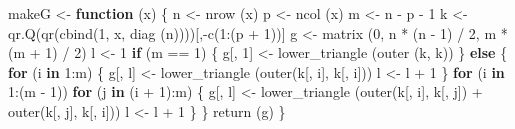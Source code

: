 \documentclass[
  12pt,
]{book}
\newenvironment{Shaded}{\begin{snugshade}}{\end{snugshade}}
\newcommand{\ControlFlowTok}[1]{\textcolor[rgb]{0.13,0.29,0.53}{\textbf{#1}}}
\newcommand{\DecValTok}[1]{\textcolor[rgb]{0.00,0.00,0.81}{#1}}
\newcommand{\FunctionTok}[1]{\textcolor[rgb]{0.00,0.00,0.00}{#1}}
\newcommand{\NormalTok}[1]{#1}
\newcommand{\OtherTok}[1]{\textcolor[rgb]{0.56,0.35,0.01}{#1}}
\newcommand{\SpecialCharTok}[1]{\textcolor[rgb]{0.00,0.00,0.00}{#1}}
\theoremstyle{definition}
\theoremstyle{definition}
\theoremstyle{definition}
\theoremstyle{definition}
\theoremstyle{remark}
\begin{document}
\begin{Shaded}
\begin{Highlighting}[]
\NormalTok{makeG }\OtherTok{\textless{}{-}} \ControlFlowTok{function}\NormalTok{ (x) \{}
\NormalTok{  n }\OtherTok{\textless{}{-}} \FunctionTok{nrow}\NormalTok{ (x)}
\NormalTok{  p }\OtherTok{\textless{}{-}} \FunctionTok{ncol}\NormalTok{ (x)}
\NormalTok{  m }\OtherTok{\textless{}{-}}\NormalTok{ n }\SpecialCharTok{{-}}\NormalTok{ p }\SpecialCharTok{{-}} \DecValTok{1}
\NormalTok{  k }\OtherTok{\textless{}{-}} \FunctionTok{qr.Q}\NormalTok{(}\FunctionTok{qr}\NormalTok{(}\FunctionTok{cbind}\NormalTok{(}\DecValTok{1}\NormalTok{, x, }\FunctionTok{diag}\NormalTok{ (n))))[,}\SpecialCharTok{{-}}\FunctionTok{c}\NormalTok{(}\DecValTok{1}\SpecialCharTok{:}\NormalTok{(p }\SpecialCharTok{+} \DecValTok{1}\NormalTok{))]}
\NormalTok{  g }\OtherTok{\textless{}{-}} \FunctionTok{matrix}\NormalTok{ (}\DecValTok{0}\NormalTok{, n }\SpecialCharTok{*}\NormalTok{ (n }\SpecialCharTok{{-}} \DecValTok{1}\NormalTok{) }\SpecialCharTok{/} \DecValTok{2}\NormalTok{, m }\SpecialCharTok{*}\NormalTok{ (m }\SpecialCharTok{+} \DecValTok{1}\NormalTok{) }\SpecialCharTok{/} \DecValTok{2}\NormalTok{)}
\NormalTok{  l }\OtherTok{\textless{}{-}} \DecValTok{1}
  \ControlFlowTok{if}\NormalTok{ (m }\SpecialCharTok{==} \DecValTok{1}\NormalTok{) \{}
\NormalTok{    g[, }\DecValTok{1}\NormalTok{] }\OtherTok{\textless{}{-}} \FunctionTok{lower\_triangle}\NormalTok{ (}\FunctionTok{outer}\NormalTok{ (k, k))}
\NormalTok{  \}}
  \ControlFlowTok{else}\NormalTok{ \{}
    \ControlFlowTok{for}\NormalTok{ (i }\ControlFlowTok{in} \DecValTok{1}\SpecialCharTok{:}\NormalTok{m) \{}
\NormalTok{      g[, l] }\OtherTok{\textless{}{-}} \FunctionTok{lower\_triangle}\NormalTok{ (}\FunctionTok{outer}\NormalTok{(k[, i], k[, i]))}
\NormalTok{      l }\OtherTok{\textless{}{-}}\NormalTok{ l }\SpecialCharTok{+} \DecValTok{1}
\NormalTok{    \}}
    \ControlFlowTok{for}\NormalTok{ (i }\ControlFlowTok{in} \DecValTok{1}\SpecialCharTok{:}\NormalTok{(m }\SpecialCharTok{{-}} \DecValTok{1}\NormalTok{))}
      \ControlFlowTok{for}\NormalTok{ (j }\ControlFlowTok{in}\NormalTok{ (i }\SpecialCharTok{+} \DecValTok{1}\NormalTok{)}\SpecialCharTok{:}\NormalTok{m) \{}
\NormalTok{        g[, l] }\OtherTok{\textless{}{-}}
          \FunctionTok{lower\_triangle}\NormalTok{ (}\FunctionTok{outer}\NormalTok{(k[, i], k[, j]) }\SpecialCharTok{+} \FunctionTok{outer}\NormalTok{(k[, j], k[, i]))}
\NormalTok{        l }\OtherTok{\textless{}{-}}\NormalTok{ l }\SpecialCharTok{+} \DecValTok{1}
\NormalTok{      \}}
\NormalTok{  \}}
  \FunctionTok{return}\NormalTok{ (g)}
\NormalTok{\}}


\end{Highlighting}
\end{Shaded}
\end{document}
